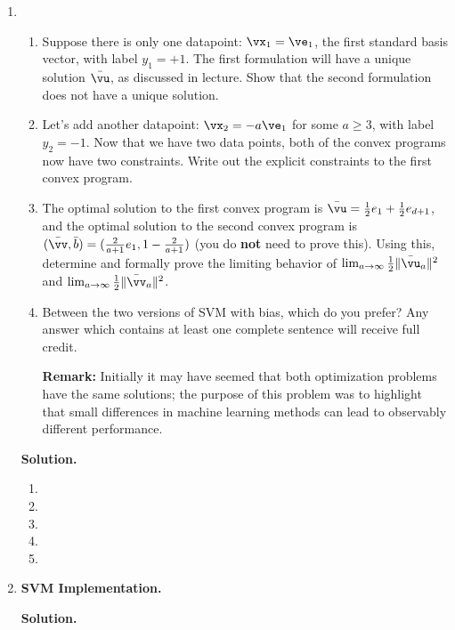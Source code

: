 \documentclass{article}
\theoremstyle{definition}
\theoremstyle{remark}
\newenvironment{Q}
{%
\clearpage
\item
}
{%
\phantom{s}%
\bigskip%
\noindent\textbf{Solution.}
}
\begin{document}
\begin{enumerate}[font={\Large\bfseries},left=0pt]
\begin{Q}
\begin{enumerate}
    \item
      Suppose there is only one datapoint: $\vx_1 = \ve_1$, the first standard basis vector, 
      with label $y_1 = +1$.
      The first formulation will have a unique solution $\bar\vu$, as discussed in lecture.
      Show that the second formulation does not have a unique solution.

    \item
      Let's add another datapoint: $\vx_2 = -a\ve_1$ for some $a\geq 3$, with label $y_2 = -1$.
      Now that we have two data points, both of the convex programs now have two constraints.
      Write out the explicit constraints to the first convex program.

    \item
      The optimal solution to the first convex program is $\bar\vu=\frac 1 2 e_1 + \frac 1 2 e_{d+1}$,
      and the optimal solution to the second convex program is $(\bar\vv,\bar b)=(\frac{2}{a+1}e_1, 1-\frac{2}{a+1})$ (you do \textbf{not} need to prove this).
      Using this, determine and formally prove the limiting behavior of
      $\lim_{a\to\infty}\frac 1 2 \|\bar\vu_a\|^2$ and $\lim_{a\to\infty}\frac 1 2 \|\bar\vv_a\|^2$.

    \item
      Between the two versions of SVM with bias, which do you prefer?
      Any answer which contains at least one complete sentence will receive full credit.

      \textbf{Remark:} Initially it may have seemed that both optimization problems have
      the same solutions; the purpose of this problem was to highlight that small differences
      in machine learning methods can lead to observably different performance.
  \end{enumerate}
\end{Q}
\begin{enumerate}
  \item
  \item
  \item
  \item
  \item
\end{enumerate}
  
\begin{Q}
    \textbf{\Large SVM Implementation.}
    

\end{Q}
\end{enumerate}
\end{document}
